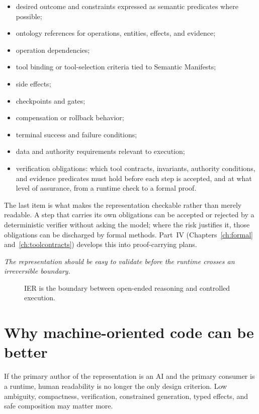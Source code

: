 \documentclass[10pt,oneside,openany]{book}
\begin{document}
\begin{itemize}
\item desired outcome and constraints expressed as semantic predicates where possible;
\item ontology references for operations, entities, effects, and evidence;
\item operation dependencies;
\item tool binding or tool-selection criteria tied to Semantic Manifests;
\item side effects;
\item checkpoints and gates;
\item compensation or rollback behavior;
\item terminal success and failure conditions;
\item data and authority requirements relevant to execution;
\item verification obligations: which tool contracts, invariants, authority conditions, and evidence predicates must hold before each step is accepted, and at what level of assurance, from a runtime check to a formal proof.
\end{itemize}

The last item is what makes the representation checkable rather than merely readable. A step that carries its own obligations can be accepted or rejected by a deterministic verifier without asking the model; where the risk justifies it, those obligations can be discharged by formal methods. Part~IV (Chapters~\ref{ch:formal} and~\ref{ch:toolcontracts}) develops this into proof-carrying plans.

\emph{The representation should be easy to validate before the runtime crosses an irreversible boundary.}

\begin{figure}[ht]
\centering
{}
\caption{IER is the boundary between open-ended reasoning and controlled execution.}
\end{figure}

\section{Why machine-oriented code can be better}
If the primary author of the representation is an AI and the primary consumer is a runtime, human readability is no longer the only design criterion. Low ambiguity, compactness, verification, constrained generation, typed effects, and safe composition may matter more.
\end{document}
